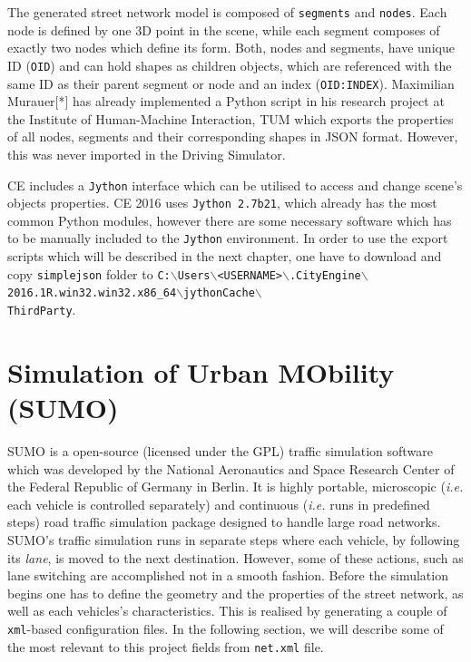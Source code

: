 The generated street network model is composed of \texttt{segments} and \texttt{nodes}. Each node is defined by one 3D point in the scene, while each segment composes of exactly two nodes which define its form. Both, nodes and segments, have unique ID (\texttt{OID}) and can hold shapes as children objects, which are referenced with the same ID as their parent segment or node and an index (\texttt{OID:INDEX}). Maximilian Murauer[*] has already implemented a Python script in his research project at the Institute of Human-Machine Interaction, TUM which exports the properties of all nodes, segments and their corresponding shapes in JSON format. However, this was never imported in the Driving Simulator.

CE includes a \texttt{Jython} interface which can be utilised to access and change scene's objects properties. CE 2016 uses \texttt{Jython 2.7b21}, which already has the most common Python modules, however there are some necessary software which has to be manually included to the \texttt{Jython} environment. In order to use the export scripts which will be described in the next chapter, one have to download and copy \texttt{simplejson} folder to \texttt{C:$\backslash$Users$\backslash$<USERNAME>$\backslash$.CityEngine$\backslash$2016.1R.win32.win32.x86\_64$\backslash$jythonCache$\backslash$\\ThirdParty}.

\section{Simulation of Urban MObility (SUMO)}
\label{ch:sumo}
SUMO is a open-source (licensed under the GPL) traffic simulation software which was developed by the National Aeronautics and Space Research Center of the Federal Republic of Germany in Berlin. It is highly portable, microscopic (\emph{i.e.} each vehicle is controlled separately) and continuous (\emph{i.e.} runs in predefined steps) road traffic simulation package designed to handle large road networks. SUMO's traffic simulation runs in separate steps where each vehicle, by following its \emph{lane}, is moved to the next destination. However, some of these actions, such as lane switching are accomplished not in a smooth fashion. Before the simulation begins one has to define the geometry and the properties of the street network, as well as each vehicles's characteristics. This is realised by generating a couple of \texttt{xml}-based configuration files. In the following section, we will describe some of the most relevant to this project fields from \texttt{net.xml} file.

